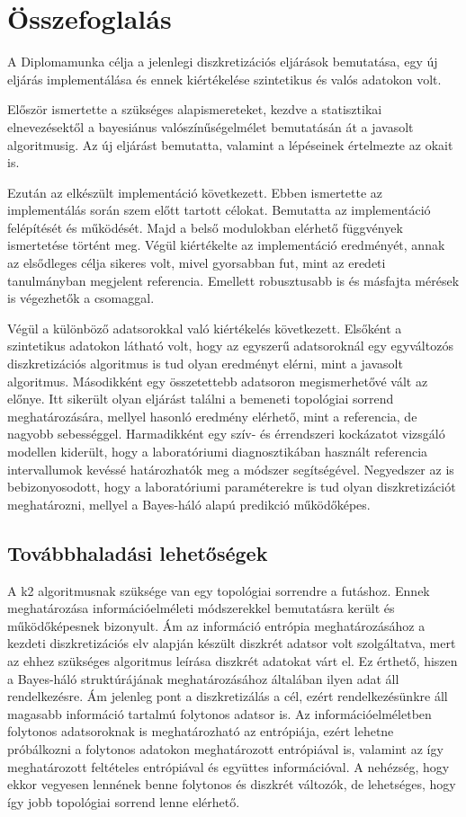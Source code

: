 \chapter{Összefoglalás}
A Diplomamunka célja a jelenlegi diszkretizációs eljárások bemutatása, egy új eljárás implementálása és ennek kiértékelése szintetikus és valós adatokon volt.

Először ismertette a szükséges alapismereteket, kezdve a statisztikai elnevezésektől a bayesiánus valószínűségelmélet bemutatásán át a javasolt algoritmusig. Az új eljárást bemutatta, valamint a lépéseinek értelmezte az okait is.

Ezután az elkészült implementáció következett. Ebben ismertette az implementálás során szem előtt tartott célokat. Bemutatta az implementáció felépítését és működését. Majd a belső modulokban elérhető függvények ismertetése történt meg. Végül kiértékelte az implementáció eredményét, annak az elsődleges célja sikeres volt, mivel gyorsabban fut, mint az eredeti tanulmányban megjelent referencia. Emellett robusztusabb is és másfajta mérések is végezhetők a csomaggal.

Végül a különböző adatsorokkal való kiértékelés következett. Elsőként a szintetikus adatokon látható volt, hogy az egyszerű adatsoroknál egy egyváltozós diszkretizációs algoritmus is tud olyan eredményt elérni, mint a javasolt algoritmus. Másodikként egy összetettebb adatsoron megismerhetővé vált az előnye. Itt sikerült olyan eljárást találni a bemeneti topológiai sorrend meghatározására, mellyel hasonló eredmény elérhető, mint a referencia, de nagyobb sebességgel. Harmadikként egy szív- és érrendszeri kockázatot vizsgáló modellen kiderült, hogy a laboratóriumi diagnosztikában használt referencia intervallumok kevéssé határozhatók meg a módszer segítségével. Negyedszer az is bebizonyosodott, hogy a laboratóriumi paraméterekre is tud olyan diszkretizációt meghatározni, mellyel a Bayes-háló alapú predikció működőképes.

\section{Továbbhaladási lehetőségek}
A k2 algoritmusnak szüksége van egy topológiai sorrendre a futáshoz. Ennek meghatározása információelméleti módszerekkel bemutatásra került és működőképesnek bizonyult. Ám az információ entrópia meghatározásához a kezdeti diszkretizációs elv alapján készült diszkrét adatsor volt szolgáltatva, mert az ehhez szükséges algoritmus leírása diszkrét adatokat várt el. Ez érthető, hiszen a Bayes-háló struktúrájának meghatározásához általában ilyen adat áll rendelkezésre. Ám jelenleg pont a diszkretizálás a cél, ezért rendelkezésünkre áll magasabb információ tartalmú folytonos adatsor is. Az információelméletben folytonos adatsoroknak is meghatározható az entrópiája, ezért lehetne próbálkozni a folytonos adatokon meghatározott entrópiával is, valamint az így meghatározott feltételes entrópiával és együttes információval. A nehézség, hogy ekkor vegyesen lennének benne folytonos és diszkrét változók, de lehetséges, hogy így jobb topológiai sorrend lenne elérhető.


